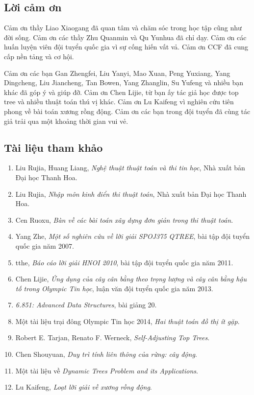 \documentclass[11pt]{article}
\begin{document}
\subsection*{Lời cảm ơn}

Cảm ơn thầy Liao Xiaogang đã quan tâm và chăm sóc trong học tập cũng như đời
sống. Cảm ơn các thầy Zhu Quanmin và Qu Yunhua đã chỉ dạy. Cảm ơn các huấn luyện
viên đội tuyển quốc gia vì sự cống hiến vất vả. Cảm ơn CCF đã cung cấp nền tảng
và cơ hội.

Cảm ơn các bạn Gan Zhengfei, Liu Yanyi, Mao Xuan, Peng Yuxiang, Yang Dingcheng,
Liu Jiancheng, Tan Bowen, Yang Zhanglin, Su Yufeng và nhiều bạn khác đã góp ý và
giúp đỡ. Cảm ơn Chen Lijie, từ bạn ấy tác giả học được top tree và nhiều thuật
toán thú vị khác. Cảm ơn Lu Kaifeng vì nghiên cứu tiên phong về bài toán xương
rồng động. Cảm ơn các bạn trong đội tuyển đã cùng tác giả trải qua một khoảng
thời gian vui vẻ.

\subsection*{Tài liệu tham khảo}

\begin{enumerate}
  \item Liu Rujia, Huang Liang, \emph{Nghệ thuật thuật toán và thi tin học}, Nhà
  xuất bản Đại học Thanh Hoa.
  \item Liu Rujia, \emph{Nhập môn kinh điển thi thuật toán}, Nhà xuất bản Đại
  học Thanh Hoa.
  \item Cen Ruoxu, \emph{Bàn về các bài toán xây dựng đơn giản trong thi thuật
  toán}.
  \item Yang Zhe, \emph{Một số nghiên cứu về lời giải SPOJ375 QTREE}, bài tập
  đội tuyển quốc gia năm 2007.
  \item tthe, \emph{Báo cáo lời giải HNOI 2010}, bài tập đội tuyển quốc gia năm
  2011.
  \item Chen Lijie, \emph{Ứng dụng của cây cân bằng theo trọng lượng và cây cân
  bằng hậu tố trong Olympic Tin học}, luận văn đội tuyển quốc gia năm 2013.
  \item \emph{6.851: Advanced Data Structures}, bài giảng 20.
  \item Một tài liệu trại đông Olympic Tin học 2014, \emph{Hai thuật toán đồ thị
  ít gặp}.
  \item Robert E. Tarjan, Renato F. Werneck, \emph{Self-Adjusting Top Trees}.
  \item Chen Shouyuan, \emph{Duy trì tính liên thông của rừng: cây động}.
  \item Một tài liệu về \emph{Dynamic Trees Problem and its Applications}.
  \item Lu Kaifeng, \emph{Loạt lời giải về xương rồng động}.
\end{enumerate}
\end{document}

